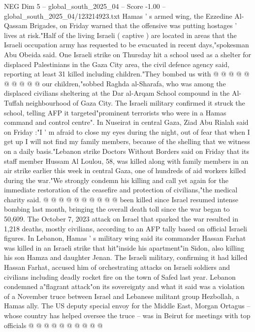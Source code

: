 \begin{textsample}{NEG Dim 5 – global\_south\_2025\_04 – Score -1.00 – global\_south\_2025\_04/123214923.txt}
Hamas ' s armed wing, the Ezzedine Al-Qassam Brigades, on Friday warned that the offensive was putting hostages ' lives at risk."Half of the living Israeli ( captive ) are located in areas that the Israeli occupation army has requested to be evacuated in recent days,"spokesman Abu Obeida said.
One Israeli strike on Thursday hit a school used as a shelter for displaced Palestinians in the Gaza City area, the civil defence agency said, reporting at least 31 killed including children."They bombed us with @ @ @ @ @ @ @ @ @ @ our children,"sobbed Raghda al-Sharafa, who was among the displaced civilians sheltering at the Dar al-Arqam School compound in the Al-Tuffah neighbourhood of Gaza City.
The Israeli military confirmed it struck the school, telling AFP it targeted"prominent terrorists who were in a Hamas command and control centre".
In Nuseirat in central Gaza, Ziad Abu Rialah said on Friday :"I ' m afraid to close my eyes during the night, out of fear that when I get up I will not find my family members, because of the shelling that we witness on a daily basis."Lebanon strike Doctors Without Borders said on Friday that its staff member Hussam Al Loulou, 58, was killed along with family members in an air strike earlier this week in central Gaza, one of hundreds of aid workers killed during the war."We strongly condemn his killing and call yet again for the immediate restoration of the ceasefire and protection of civilians,"the medical charity said. @ @ @ @ @ @ @ @ @ @ been killed since Israel resumed intense bombing last month, bringing the overall death toll since the war began to 50,609.
The October 7, 2023 attack on Israel that sparked the war resulted in 1,218 deaths, mostly civilians, according to an AFP tally based on official Israeli figures.
In Lebanon, Hamas ' s military wing said its commander Hassan Farhat was killed in an Israeli strike that hit"inside his apartment"in Sidon, also killing his son Hamza and daughter Jenan.
The Israeli military, confirming it had killed Hassan Farhat, accused him of orchestrating attacks on Israeli soldiers and civilians including deadly rocket fire on the town of Safed last year.
Lebanon condemned a"flagrant attack"on its sovereignty and what it said was a violation of a November truce between Israel and Lebanese militant group Hezbollah, a Hamas ally.
The US deputy special envoy for the Middle East, Morgan Ortagus -- whose country has helped oversee the truce -- was in Beirut for meetings with top officials @ @ @ @ @ @ @ @ @ @

\end{textsample}
